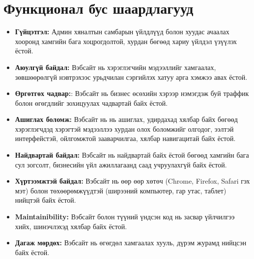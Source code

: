 \section{Функционал бус шаардлагууд}
\begin{itemize}
	\item \textbf{Гүйцэтгэл:} Админ хяналтын самбарын үйлдлүүд болон хуудас ачаалах хооронд хамгийн бага хоцрогдолтой, хурдан бөгөөд хариу үйлдэл үзүүлэх ёстой.

	\item \textbf{Аюулгүй байдал:} Вэбсайт нь хэрэглэгчийн мэдээллийг хамгаалах, зөвшөөрөлгүй нэвтрэхээс урьдчилан сэргийлэх хатуу арга хэмжээ авах ёстой.

	\item \textbf{Өргөтгөх чадвар:}: Вэбсайт нь бизнес өсөхийн хэрээр нэмэгдэж буй траффик болон өгөгдлийг зохицуулах чадвартай байх ёстой.

	\item \textbf{Ашиглах боломж:} Вэбсайт нь  нь ашиглах, удирдахад хялбар байх бөгөөд хэрэглэгчдэд хэрэгтэй мэдээллээ хурдан олох боломжийг олгодог, ээлтэй интерфейстэй, ойлгомжтой зааварчилгаа, хялбар навигацитай байх ёстой.

	\item \textbf{Найдвартай байдал:} Вэбсайт нь найдвартай байх ёстой бөгөөд хамгийн бага сул зогсолт, бизнесийн үйл ажиллагаанд саад учруулахгүй байх ёстой.

	\item \textbf{Хүртээмжтэй байдал:} Вэбсайт нь өөр өөр хөтөч (Chrome, Firefox, Safari гэх мэт) болон төхөөрөмжүүдтэй (ширээний компьютер, гар утас, таблет) нийцтэй байх ёстой.

	\item \textbf{Maintainibility:} Вэбсайт болон түүний үндсэн код нь засвар үйлчилгээ хийх, шинэчлэхэд хялбар байх ёстой.

	\item \textbf{Дагаж мөрдөх:} Вэбсайт нь өгөгдөл хамгаалах хууль, дүрэм журамд нийцсэн байх ёстой.
\end{itemize}

